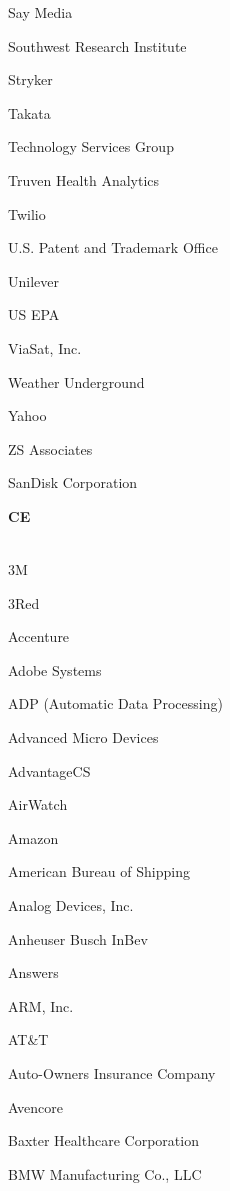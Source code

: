 \documentclass[twoside]{article}
\begin{document}
\begin{center}
\begin{multicols}{5}
\begin{FlushLeft}
\begin{compactitem}
\item Say Media
\item Southwest Research Institute
\item Stryker
\item Takata
\item Technology Services Group
\item Truven Health Analytics
\item Twilio
\item U.S. Patent and Trademark Office
\item Unilever
\item US EPA
\item ViaSat, Inc.
\item Weather Underground
\item Yahoo
\item ZS Associates
\item SanDisk Corporation
\end{compactitem}
        \end{FlushLeft}
        \vspace{1em}
        {\fontsize{14}{16}\selectfont \bf CE}\\
        \vspace{-1em}
        ~\hrulefill~
        \vspace{-.9em}
        \begin{FlushLeft}
        \begin{compactitem}
        \item 3M
\item 3Red
\item Accenture
\item Adobe Systems
\item ADP (Automatic Data Processing)
\item Advanced Micro Devices
\item AdvantageCS
\item AirWatch
\item Amazon
\item American Bureau of Shipping
\item Analog Devices, Inc.
\item Anheuser Busch InBev
\item Answers
\item ARM, Inc.
\item AT\&T
\item Auto-Owners Insurance Company
\item Avencore
\item Baxter Healthcare Corporation
\item BMW Manufacturing Co., LLC

\end{compactitem}
\end{FlushLeft}
\end{multicols}
\end{center}
\end{document}
